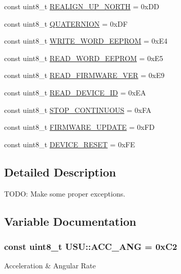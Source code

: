 \begin{DoxyCompactItemize}
\item 
const uint8\-\_\-t \hyperlink{namespace_u_s_u_a9c5f8777b9c35aaaa0b64490d1f9a20d}{\-R\-E\-A\-L\-I\-G\-N\-\_\-\-U\-P\-\_\-\-N\-O\-R\-T\-H} = 0x\-D\-D
\item 
const uint8\-\_\-t \hyperlink{namespace_u_s_u_ad476e2e7f70dbe869e508f676bea92a9}{\-Q\-U\-A\-T\-E\-R\-N\-I\-O\-N} = 0x\-D\-F
\item 
const uint8\-\_\-t \hyperlink{namespace_u_s_u_a483eb9b7abe528d9fe3e843b4655a977}{\-W\-R\-I\-T\-E\-\_\-\-W\-O\-R\-D\-\_\-\-E\-E\-P\-R\-O\-M} = 0x\-E4
\item 
const uint8\-\_\-t \hyperlink{namespace_u_s_u_ac9d01a02c622d06449580697749db1f5}{\-R\-E\-A\-D\-\_\-\-W\-O\-R\-D\-\_\-\-E\-E\-P\-R\-O\-M} = 0x\-E5
\item 
const uint8\-\_\-t \hyperlink{namespace_u_s_u_a7d0e77d37d6107d2869c30f57412e8b0}{\-R\-E\-A\-D\-\_\-\-F\-I\-R\-M\-W\-A\-R\-E\-\_\-\-V\-E\-R} = 0x\-E9
\item 
const uint8\-\_\-t \hyperlink{namespace_u_s_u_ad810b0281ab629302e9fd716374b90ed}{\-R\-E\-A\-D\-\_\-\-D\-E\-V\-I\-C\-E\-\_\-\-I\-D} = 0x\-E\-A
\item 
const uint8\-\_\-t \hyperlink{namespace_u_s_u_ae7447325a101912b787905199c4f2acb}{\-S\-T\-O\-P\-\_\-\-C\-O\-N\-T\-I\-N\-U\-O\-U\-S} = 0x\-F\-A
\item 
const uint8\-\_\-t \hyperlink{namespace_u_s_u_a321d286cf60a5fd674ad8c0286db8748}{\-F\-I\-R\-M\-W\-A\-R\-E\-\_\-\-U\-P\-D\-A\-T\-E} = 0x\-F\-D
\item 
const uint8\-\_\-t \hyperlink{namespace_u_s_u_a7c9f78c9bb18ba92a529bf5819f6a5d2}{\-D\-E\-V\-I\-C\-E\-\_\-\-R\-E\-S\-E\-T} = 0x\-F\-E
\end{DoxyCompactItemize}


\subsection{\-Detailed \-Description}
\-T\-O\-D\-O\-: \-Make some proper exceptions. 

\subsection{\-Variable \-Documentation}
\hypertarget{namespace_u_s_u_a0517f100ec98a93fb28d4ae52a943b19}{
\subsubsection[{\-A\-C\-C\-\_\-\-A\-N\-G}]{\setlength{\rightskip}{0pt plus 5cm}const uint8\-\_\-t {\bf \-U\-S\-U\-::\-A\-C\-C\-\_\-\-A\-N\-G} = 0x\-C2}}\label{namespace_u_s_u_a0517f100ec98a93fb28d4ae52a943b19}
\-Acceleration \& \-Angular \-Rate 

